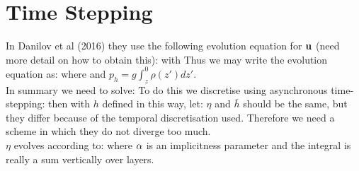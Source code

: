 \documentclass[10pt]{article}
\begin{document}
 			\section{Time Stepping}
 			In Danilov et al (2016) they use the following evolution equation for $\mathbf{u}$ (need more detail on how to obtain this):
 			with
 			Thus we may write the evolution equation as:
 			where
 			and $p_{h} = g\int_{z}^{0} \rho(z') dz'$.\\
 			\linebreak
 			In summary we need to solve:
 			To do this we discretise using asynchronous time-stepping:
 			then with $h$ defined in this way, let:
 			$\eta$ and $\bar{h}$ should be the same, but they differ because of the temporal discretisation used. Therefore we need a scheme in which they do not diverge too much. \\
 			\linebreak
 			$\eta$ evolves according to:
 			where $\alpha$ is an implicitness parameter and the integral is really a sum vertically over layers.\\
\end{document}
